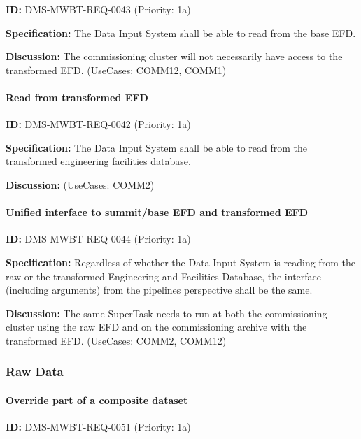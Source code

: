 \documentclass[SE,toc,lsstdraft]{lsstdoc}
\begin{document}
\label{DMS-MWBT-REQ-0043}
\textbf{ID:} DMS-MWBT-REQ-0043 (Priority: 1a)

\textbf{Specification:}
The Data Input System shall be able to read from the base EFD.

\textbf{Discussion:}
The commissioning cluster will not necessarily have access to the transformed EFD. (UseCases: COMM12, COMM1)

\paragraph{Read from transformed EFD}\hfill  %

\label{DMS-MWBT-REQ-0042}
\textbf{ID:} DMS-MWBT-REQ-0042 (Priority: 1a)

\textbf{Specification:}
The Data Input System shall be able to read from the transformed engineering facilities database.

\textbf{Discussion:}
(UseCases: COMM2)

\paragraph{Unified interface to summit/base EFD and transformed EFD}\hfill  %

\label{DMS-MWBT-REQ-0044}
\textbf{ID:} DMS-MWBT-REQ-0044 (Priority: 1a)

\textbf{Specification:}
Regardless of whether the Data Input System is reading from the raw or the transformed Engineering and Facilities Database, the interface (including arguments) from the pipelines perspective shall be the same.

\textbf{Discussion:}
The same SuperTask needs to run at both the commissioning cluster using the raw EFD and on the commissioning archive with the transformed EFD. (UseCases: COMM2, COMM12)

\subsubsection{Raw Data}

\paragraph{Override part of a composite dataset}\hfill  %

\label{DMS-MWBT-REQ-0051}
\textbf{ID:} DMS-MWBT-REQ-0051 (Priority: 1a)
\end{document}
